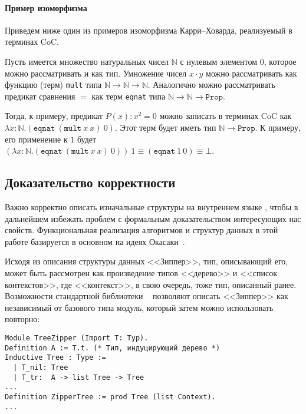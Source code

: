 \paragraph{Пример изоморфизма}
Приведем ниже один из примеров изоморфизма Карри--Ховарда, реализуемый в терминах CoC.

Пусть имеется множество натуральных чисел $\mathbb{N}$ с нулевым элементом $0$, которое можно рассматривать и как тип. Умножение чисел $x \cdot y$ можно рассматривать как функцию (терм) \texttt{mult} типа $\mathbb{N} \rightarrow \mathbb{N} \rightarrow \mathbb{N}$. Аналогично можно рассматривать предикат сравнения $=$ как терм \texttt{eqnat} типа $\mathbb{N} \rightarrow \mathbb{N} \rightarrow \texttt{Prop}$. 

Тогда, к примеру, предикат $P(x):x^2 = 0$ можно записать в терминах CoC как $\lambda x:\mathbb{N}. (\texttt{eqnat}\ (\texttt{mult}\ x\ x)\ 0)$. Этот терм будет иметь тип $\mathbb{N} \rightarrow \texttt{Prop}$. К примеру, его применение к $1$ будет $(\lambda x:\mathbb{N}. (\texttt{eqnat}\ (\texttt{mult}\ x\ x)\ 0))\ 1 \equiv (\texttt{eqnat}\ 1\ 0) \equiv \bot$. 

\subsection{Доказательство корректности}

Важно корректно описать изначальные структуры на внутреннем языке \tcoq, чтобы в дальнейшем избежать проблем с формальным доказательством интересующих нас свойств. Функциональная реализация алгоритмов и структур данных в этой работе базируется в основном на идеях Окасаки~\autocite{Okasaki1996}.

Исходя из описания структуры данных <<Зиппер>>, тип, описывающий его, может быть рассмотрен как произведение типов <<дерево>> и <<список контекстов>>, где <<контекст>>, в свою очередь, тоже тип, описанный ранее. Возможности стандартной библиотеки \tcoq~ позволяют описать <<Зиппер>> как независимый от базового типа модуль, который затем можно использовать повторно:

\begin{Verbatim}[fontsize=\small]
Module TreeZipper (Import T: Typ).
Definition A := T.t. (* Тип, индуцирующий дерево *)
Inductive Tree : Type :=
  | T_nil: Tree
  | T_tr:  A -> list Tree -> Tree
...
Definition ZipperTree := prod Tree (list Context).
...
\end{Verbatim}

